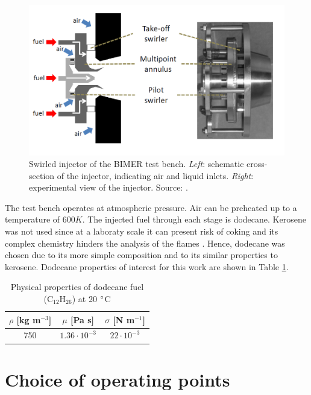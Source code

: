 \begin{figure}[h!]
	\centering
	\includegraphics[scale=0.7]{./part3_applications/figures_ch7_aero/BIMER_swirler}
	\caption{Swirled injector of the BIMER test bench. \textsl{Left}: schematic cross-section of the injector, indicating air and liquid inlets. \textsl{Right}: experimental view of the injector. Source: .}
	\label{fig:BIMER_swirler}
\end{figure}

The test bench operates at atmospheric pressure. Air can be preheated up to a temperature of $600 K$. The injected fuel through each stage is dodecane. Kerosene was not used since at a laboraty scale it can present risk of coking and its complex chemistry hinders the analysis of the flames . Hence, dodecane was chosen due to its more simple composition and to its similar properties to kerosene. Dodecane properties of interest for this work are shown in Table \ref{tab:dodecane_properties}.

\begin{table}[!h]
\centering
\caption{Physical properties of dodecane fuel (C$_{12}$H$_26$) at 20 $\degree$C}
\begin{tabular}{|c|c|c|}
\hline
$\rho$ [kg m$^{-3}$]   & $\mu$ [Pa s]   & $\sigma$ [N m$^{-1}$]  \\
\hline
750 & $1.36 \cdot 10^{-3}$ & $22 \cdot 10^{-3}$ \\
\hline
\end{tabular}
\label{tab:dodecane_properties}
\end{table}


\section{Choice of operating points}

